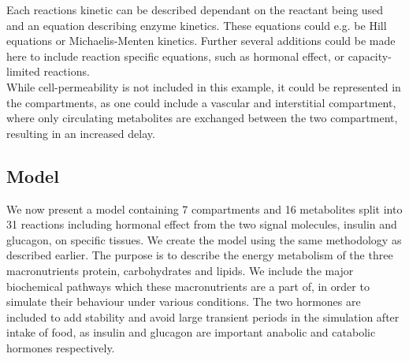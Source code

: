 \documentclass{IEEEtran}
\begin{document}
Each reactions kinetic can be described dependant on the reactant being used and an equation describing enzyme kinetics. These equations could e.g. be Hill equations or Michaelis-Menten kinetics. Further several additions could be made here to include reaction specific equations, such as hormonal effect, or capacity-limited reactions. \\

While cell-permeability is not included in this example, it could be represented in the compartments, as one could include a vascular and interstitial compartment, where only circulating metabolites are exchanged between the two compartment, resulting in an increased delay.



\newpage
\subsection{Model}


We now present a model containing 7 compartments and 16 metabolites split into 31 reactions including hormonal effect from the two signal molecules, insulin and glucagon, on specific tissues. We create the model using the same methodology as described earlier. The purpose is to describe the energy metabolism of the three macronutrients protein, carbohydrates and lipids. We include the major biochemical pathways which these macronutrients are a part of, in order to simulate their behaviour under various conditions. The two hormones are included to add stability and avoid large transient periods in the simulation after intake of food, as insulin and glucagon are important anabolic and catabolic hormones respectively. \\
\end{document}
